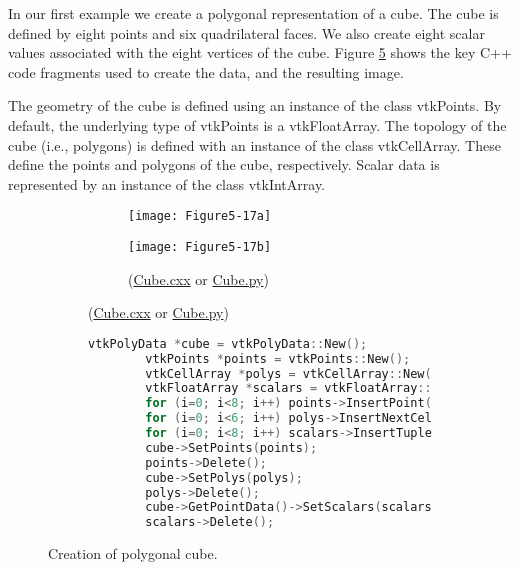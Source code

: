 \begin{description}[leftmargin=0cm,labelindent=0cm]

\item[Create a Polygonal Dataset.\index{polygonal data!example|(}]
In our first example we create a polygonal representation of a cube. The cube is defined by eight points and six quadrilateral faces. We also create eight scalar values associated with the eight vertices of the cube. Figure \ref{fig:Figure5-17} shows the key C++ code fragments used to create the data, and the resulting image.

The geometry of the cube is defined using an instance of the class vtkPoints. By default, the underlying type of vtkPoints is a vtkFloatArray. The topology of the cube (i.e., polygons) is defined with an instance of the class vtkCellArray. These define the points and polygons of the cube, respectively. Scalar data is represented by an instance of the class vtkIntArray.

\begin{figure}[!htb]
    \centering
    \begin{subfigure}[h]{0.96\linewidth}
    	\begin{subfigure}[h]{0.48\linewidth}
    		\texttt{[image: Figure5-17a]}
    		\caption*{}
    		\label{fig:Figure5-17a}
    	\end{subfigure}
    	\hfill
    	\begin{subfigure}[h]{0.48\linewidth}
    		\texttt{[image: Figure5-17b]}
    		\caption*{(\href{https://lorensen.github.io/VTKExamples/site/Cxx/GeometricObjects/Cube/}{Cube.cxx} or \href{https://lorensen.github.io/VTKExamples/site/Python/GeometricObjects/Cube/}{Cube.py})}
    		\label{fig:Figure5-17b}
    	\end{subfigure}
	\end{subfigure}
	\hfill
	\begin{subfigure}[h]{0.76\linewidth}
		\begin{lstlisting}[language=C++, caption={}]
		vtkPolyData *cube = vtkPolyData::New();
		vtkPoints *points = vtkPoints::New();
		vtkCellArray *polys = vtkCellArray::New();
		vtkFloatArray *scalars = vtkFloatArray::New();
		for (i=0; i<8; i++) points->InsertPoint(i,x[i]);
		for (i=0; i<6; i++) polys->InsertNextCell(4,pts[i]);
		for (i=0; i<8; i++) scalars->InsertTuple1(i,i);
		cube->SetPoints(points);
		points->Delete();
		cube->SetPolys(polys);
		polys->Delete();
		cube->GetPointData()->SetScalars(scalars);
		scalars->Delete();
		\end{lstlisting}
		\caption*{}
		\label{fig:Figure5-17c}
	\end{subfigure}
	\caption{Creation of polygonal cube.}\label{fig:Figure5-17}
\end{figure}


\end{description}
